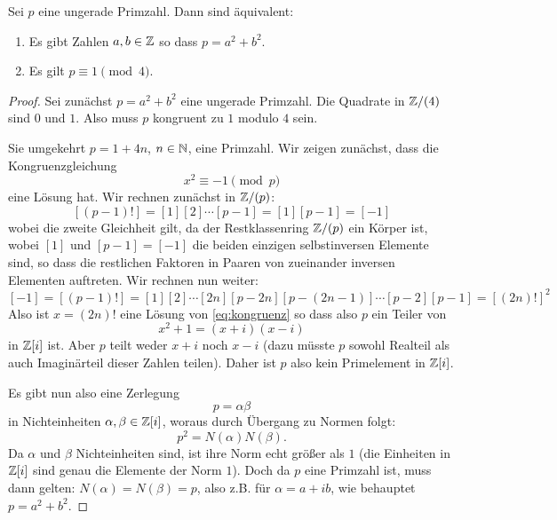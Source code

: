 \documentclass{book}
\begin{document}
\begin{lem}
    \label{lem:Gausslem} Sei $p$ eine ungerade Primzahl. Dann sind äquivalent:
    \begin{enumerate}[label=(\roman *)]
        \item Es gibt Zahlen $a,b \in \mathbb{Z}$ so dass $p = a^2 + b^2$.
        \item Es gilt $p \equiv 1 \pmod{4}$. 
    \end{enumerate}
\end{lem}
\begin{proof}
    Sei zunächst $p = a^2 + b^2$ eine ungerade Primzahl. Die Quadrate in
    $\mathbb{Z}/(4)$ sind $0$ und $1$. Also muss $p$ kongruent zu $1$ modulo $4$
    sein.

    Sie umgekehrt $p = 1 + 4n$, $n \in \mathbb{N}$, eine Primzahl. Wir zeigen
    zunächst, dass die Kongruenzgleichung
    \begin{equation}\label{eq:kongruenz}
       x^2 \equiv -1 \pmod{p}
    \end{equation}
    eine Lösung hat. Wir rechnen zunächst in $\mathbb{Z}/(p)$:
    \[
        [(p-1)!] = [1] [2] \cdots [p-1] = [1][p-1] = [-1]
    \]
    wobei die zweite Gleichheit gilt, da der Restklassenring $\mathbb{Z}/(p)$ ein
    Körper ist, wobei $[1]$ und $[p-1] = [-1]$ die beiden einzigen
    selbstinversen Elemente sind, so dass die restlichen Faktoren in Paaren von
    zueinander inversen Elementen auftreten. Wir rechnen nun weiter:
    \[
        [-1] = [(p-1)!] = [1][2] \cdots [2n][p-2n][p-(2n-1)] \cdots [p-2][p-1] = [(2n)!]^2
    \]
    Also ist $x = (2n)!$ eine Lösung von \eqref{eq:kongruenz} so dass also $p$ ein Teiler von 
    \[
        x^2 + 1 = (x+i)(x-i)
    \]
    in $\mathbb{Z}[i]$ ist. Aber $p$ teilt weder $x+i$ noch $x-i$ (dazu müsste $p$
    sowohl Realteil als auch Imaginärteil dieser Zahlen teilen). Daher ist $p$
    also kein Primelement in $\mathbb{Z}[i]$. 

    Es gibt nun also eine Zerlegung 
    \[
        p = \alpha \beta
    \] 
    in Nichteinheiten $\alpha,\beta \in \mathbb{Z}[i]$, woraus durch Übergang zu Normen folgt:
    \[
        p^2 = N(\alpha)N(\beta).
    \]
    Da $\alpha$ und $\beta$ Nichteinheiten sind, ist ihre Norm echt größer als
    $1$ (die Einheiten in $\mathbb{Z}[i]$ sind genau die Elemente der Norm $1$). Doch
    da $p$ eine Primzahl ist, muss dann gelten: $N(\alpha) = N(\beta) = p$,
    also z.B. für $\alpha = a + i b$, wie behauptet $p = a^2 + b^2$. 
\end{proof}
\end{document}
